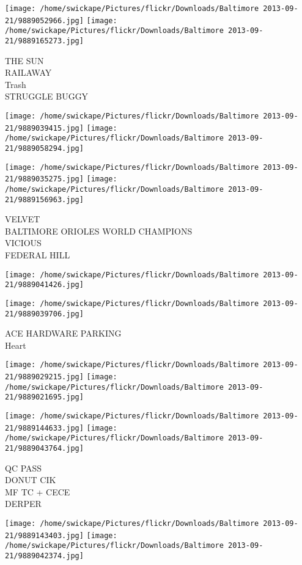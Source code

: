 \documentclass[10pt,letterpaper]{article}
\begin{document}
\texttt{[image: /home/swickape/Pictures/flickr/Downloads/Baltimore 2013-09-21/9889052966.jpg]}
\texttt{[image: /home/swickape/Pictures/flickr/Downloads/Baltimore 2013-09-21/9889165273.jpg]}

THE SUN\\
RAILAWAY\\
Trash\\
STRUGGLE BUGGY
\pagebreak

\texttt{[image: /home/swickape/Pictures/flickr/Downloads/Baltimore 2013-09-21/9889039415.jpg]}
\texttt{[image: /home/swickape/Pictures/flickr/Downloads/Baltimore 2013-09-21/9889058294.jpg]}

\texttt{[image: /home/swickape/Pictures/flickr/Downloads/Baltimore 2013-09-21/9889035275.jpg]}
\texttt{[image: /home/swickape/Pictures/flickr/Downloads/Baltimore 2013-09-21/9889156963.jpg]}

VELVET\\
BALTIMORE ORIOLES WORLD CHAMPIONS\\
VICIOUS\\
FEDERAL HILL
\pagebreak

\texttt{[image: /home/swickape/Pictures/flickr/Downloads/Baltimore 2013-09-21/9889041426.jpg]}

\vspace{0.25in}
\texttt{[image: /home/swickape/Pictures/flickr/Downloads/Baltimore 2013-09-21/9889039706.jpg]}

ACE HARDWARE PARKING\\
Heart
\pagebreak

\texttt{[image: /home/swickape/Pictures/flickr/Downloads/Baltimore 2013-09-21/9889029215.jpg]}
\texttt{[image: /home/swickape/Pictures/flickr/Downloads/Baltimore 2013-09-21/9889021695.jpg]}

\texttt{[image: /home/swickape/Pictures/flickr/Downloads/Baltimore 2013-09-21/9889144633.jpg]}
\texttt{[image: /home/swickape/Pictures/flickr/Downloads/Baltimore 2013-09-21/9889043764.jpg]}

QC PASS\\
DONUT CIK\\
MF TC + CECE\\
DERPER
\pagebreak

\texttt{[image: /home/swickape/Pictures/flickr/Downloads/Baltimore 2013-09-21/9889143403.jpg]}
\texttt{[image: /home/swickape/Pictures/flickr/Downloads/Baltimore 2013-09-21/9889042374.jpg]}
\end{document}
